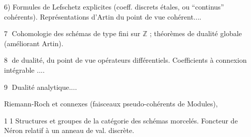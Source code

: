 6) Formules de Lefschetz explicites (coeff. discrets étales, ou ``continus'' cohérents). Représentations d'Artin du point de vue cohérent....

\textcircled{7} Cohomologie des schémas de type fini sur $\mathbb{Z}$ ; théorèmes de dualité globale  (améliorant Artin).

\textcircled{8}  de dualité, du point de vue opérateurs différentiels. Coefficients à connexion intégrable .... 

\textcircled{9} Dualité analytique....

Riemann-Roch et  connexes (faisceaux pseudo-cohérents de Modules),  

\textcircled{\small 11} Structures et groupes de la catégorie des schémas morcelés. Foncteur de Néron relatif à un anneau de val. discrète.

